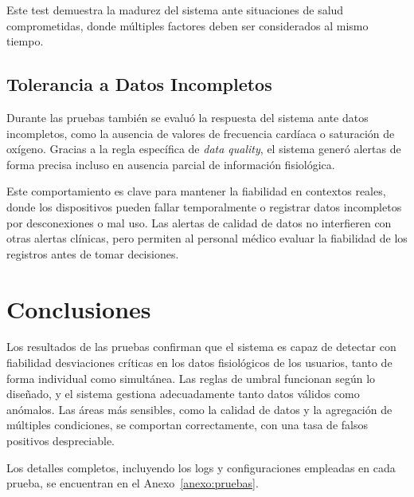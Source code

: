 Este test demuestra la madurez del sistema ante situaciones de salud comprometidas, donde múltiples factores deben ser considerados al mismo tiempo.

\subsection{Tolerancia a Datos Incompletos}
\label{subsec:datos_incompletos}

Durante las pruebas también se evaluó la respuesta del sistema ante datos incompletos, como la ausencia de valores de frecuencia cardíaca o saturación de oxígeno. Gracias a la regla específica de \textit{data quality}, el sistema generó alertas de forma precisa incluso en ausencia parcial de información fisiológica.

Este comportamiento es clave para mantener la fiabilidad en contextos reales, donde los dispositivos pueden fallar temporalmente o registrar datos incompletos por desconexiones o mal uso. Las alertas de calidad de datos no interfieren con otras alertas clínicas, pero permiten al personal médico evaluar la fiabilidad de los registros antes de tomar decisiones.

\section{Conclusiones}
\label{sec:conclusiones_validacion}

Los resultados de las pruebas confirman que el sistema es capaz de detectar con fiabilidad desviaciones críticas en los datos fisiológicos de los usuarios, tanto de forma individual como simultánea. Las reglas de umbral funcionan según lo diseñado, y el sistema gestiona adecuadamente tanto datos válidos como anómalos. Las áreas más sensibles, como la calidad de datos y la agregación de múltiples condiciones, se comportan correctamente, con una tasa de falsos positivos despreciable.

Los detalles completos, incluyendo los logs y configuraciones empleadas en cada prueba, se encuentran en el Anexo~\ref{anexo:pruebas}.

